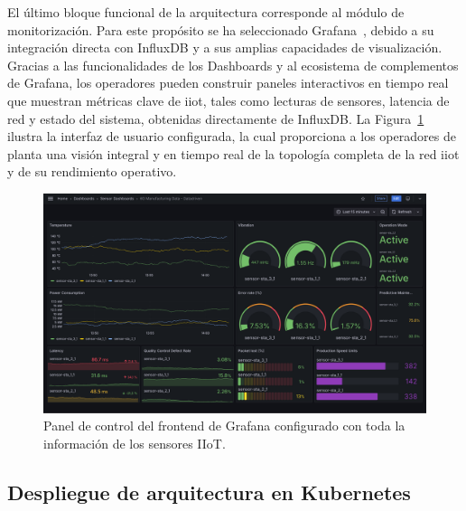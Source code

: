 El último bloque funcional de la arquitectura corresponde al módulo de monitorización. Para este propósito se ha seleccionado Grafana~\cite{grafana}, debido a su integración directa con InfluxDB y a sus amplias capacidades de visualización. Gracias a las funcionalidades de los Dashboards y al ecosistema de complementos de Grafana, los operadores pueden construir paneles interactivos en tiempo real que muestran métricas clave de \gls{iiot}, tales como lecturas de sensores, latencia de red y estado del sistema, obtenidas directamente de InfluxDB. La Figura~\ref{fig:grafana} ilustra la interfaz de usuario configurada, la cual proporciona a los operadores de planta una visión integral y en tiempo real de la topología completa de la red \gls{iiot} y de su rendimiento operativo. 


\begin{figure}[ht!]
    \centering
    \includegraphics[width=\textwidth]{fig/08_datadriven/datadriven_08.pdf}
    \caption{Panel de control del frontend de Grafana configurado con toda la información de los sensores IIoT.}
    \label{fig:grafana}
\end{figure}


\subsection{Despliegue de arquitectura en Kubernetes}
\label{subsec:k8s}

